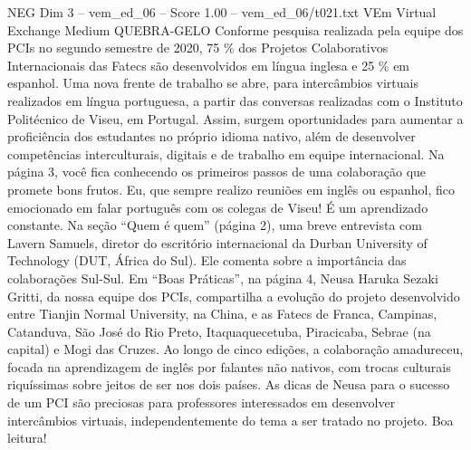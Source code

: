 \begin{textsample}{NEG Dim 3 – vem\_ed\_06 – Score 1.00 – vem\_ed\_06/t021.txt}  \label{ex:f3_neg_096}
VEm Virtual Exchange Medium QUEBRA-GELO Conforme pesquisa realizada pela equipe dos PCIs no segundo semestre de 2020, 75 \% dos Projetos Colaborativos Internacionais das Fatecs são desenvolvidos em língua inglesa e 25 \% em espanhol.
Uma nova frente de trabalho se abre, para intercâmbios virtuais realizados em língua portuguesa, a partir das conversas realizadas com o Instituto Politécnico de Viseu, em Portugal.
Assim, surgem oportunidades para aumentar a proficiência dos estudantes no próprio idioma nativo, além de desenvolver competências interculturais, digitais e de trabalho em equipe internacional.
Na página 3, você fica conhecendo os primeiros passos de uma colaboração que promete bons frutos.
Eu, que sempre realizo reuniões em inglês ou espanhol, fico emocionado em falar português com os colegas de Viseu!
É um aprendizado constante.
Na seção “Quem é quem” (página 2), uma breve entrevista com Lavern Samuels, diretor do escritório internacional da Durban University of Technology (DUT, África do Sul).
Ele comenta sobre a importância das colaborações Sul-Sul.
Em “Boas Práticas”, na página 4, Neusa Haruka Sezaki Gritti, da nossa equipe dos PCIs, compartilha a evolução do projeto desenvolvido entre Tianjin Normal University, na China, e as Fatecs de Franca, Campinas, Catanduva, São José do Rio Preto, Itaquaquecetuba, Piracicaba, Sebrae (na capital) e Mogi das Cruzes.
Ao longo de cinco edições, a colaboração amadureceu, focada na aprendizagem de inglês por falantes não nativos, com trocas culturais riquíssimas sobre jeitos de ser nos dois países.
As dicas de Neusa para o sucesso de um PCI são preciosas para professores interessados em desenvolver intercâmbios virtuais, independentemente do tema a ser tratado no projeto.
Boa leitura!

\end{textsample}
